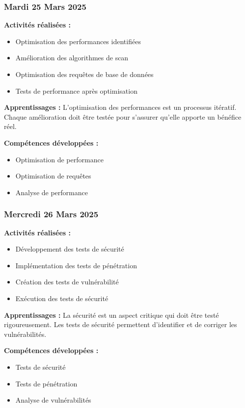 \documentclass[12pt,a4paper]{article}
\begin{document}
\subsubsection{Mardi 25 Mars 2025}
\textbf{Activités réalisées :}
\begin{itemize}
    \item Optimisation des performances identifiées
    \item Amélioration des algorithmes de scan
    \item Optimisation des requêtes de base de données
    \item Tests de performance après optimisation
\end{itemize}

\textbf{Apprentissages :}
L'optimisation des performances est un processus itératif. Chaque amélioration doit être testée pour s'assurer qu'elle apporte un bénéfice réel.

\textbf{Compétences développées :}
\begin{itemize}
    \item Optimisation de performance
    \item Optimisation de requêtes
    \item Analyse de performance
\end{itemize}

\subsubsection{Mercredi 26 Mars 2025}
\textbf{Activités réalisées :}
\begin{itemize}
    \item Développement des tests de sécurité
    \item Implémentation des tests de pénétration
    \item Création des tests de vulnérabilité
    \item Exécution des tests de sécurité
\end{itemize}

\textbf{Apprentissages :}
La sécurité est un aspect critique qui doit être testé rigoureusement. Les tests de sécurité permettent d'identifier et de corriger les vulnérabilités.

\textbf{Compétences développées :}
\begin{itemize}
    \item Tests de sécurité
    \item Tests de pénétration
    \item Analyse de vulnérabilités
\end{itemize}
\end{document}
